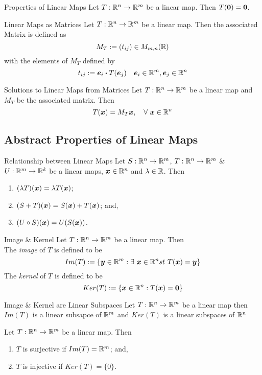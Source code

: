 \documentclass[11pt,a4paper]{article}
\begin{document}
\subtitle{Theorem 5.02 - }{Properties of Linear Maps}
Let $T : \mathbb{R}^n \to \mathbb{R}^m$ be a linear map. Then $T(\boldsymbol{0}) = \boldsymbol{0}$. \\

\subtitle{Definiton 5.03 - }{Linear Maps as Matrices}
Let $T : \mathbb{R}^n \to \mathbb{R}^m$ be a linear map. Then the associated Matrix is defined as
$$M_T := (t_{ij}) \in M_{m,n}(\mathbb{R})$$
with the elements of $M_T$ defined by
$$t_{ij} := \boldsymbol{e}_i \boldsymbol{\cdot} T(\boldsymbol{e}_j)\quad\boldsymbol{e}_i \in \mathbb{R}^m, \boldsymbol{e}_j \in \mathbb{R}^n$$

\subtitle{Theorem 5.04 - }{Solutions to Linear Maps from Matrices}
Let $T : \mathbb{R}^n \to \mathbb{R}^m$ be a linear map and $M_T$ be the associated matrix. Then $$T(\boldsymbol{x}) = M_T\boldsymbol{x},\quad \forall\ \boldsymbol{x} \in \mathbb{R}^n$$

\subsection{Abstract Properties of Linear Maps}
%
\subtitle{Theorem 5.05 - }{Relationship between Linear Maps}
Let $S : \mathbb{R}^n \to \mathbb{R}^m$, $T : \mathbb{R}^n \to \mathbb{R}^m$ \& $U : \mathbb{R}^m \to \mathbb{R}^k$ be a linear maps, $\boldsymbol{x} \in \mathbb{R}^n$ and $\lambda \in \mathbb{R}$. Then
\begin{enumerate}[label=\roman*)]
  \item $(\lambda T)(\boldsymbol{x}) = \lambda T(\boldsymbol{x})$;
  \item $(S + T)(\boldsymbol{x}) = S(\boldsymbol{x}) + T(\boldsymbol{x})$; and,
  \item $(U \circ S)(\boldsymbol{x}) = U(S(\boldsymbol{x}))$.\\
\end{enumerate}

\subtitle{Definition 5.06 - }{Image \& Kernel}
Let $T : \mathbb{R}^n \to \mathbb{R}^m$ be a linear map. Then\\
The \textit{image} of $T$ is defined to be $$Im(T) := \{\boldsymbol{y} \in \mathbb{R}^m : \exists\ \boldsymbol{x} \in \mathbb{R}^n st\ T(\boldsymbol{x}) = \boldsymbol{y}\}$$
The \textit{kernel} of $T$ is defined to be $$Ker(T) := \{\boldsymbol{x} \in \mathbb{R}^n : T(\boldsymbol{x}) = \boldsymbol{0}\}$$

\subtitle{Theorem 5.07 - }{Image \& Kernel are Linear Subspaces}
Let $T : \mathbb{R}^n \to \mathbb{R}^m$ be a linear map then $Im(T)$ is a linear subsapce of $\mathbb{R}^m$ and $Ker(T)$ is a linear subspaces of $\mathbb{R}^n$ \\

\subtitle{Remark 5.08}{}
Let $T : \mathbb{R}^n \to \mathbb{R}^m$ be a linear map. Then
\begin{enumerate}[label=\roman*)]
  \item $T$ is surjective if $Im(T) = \mathbb{R}^m$; and,
  \item $T$ is injective if $Ker(T) = \{ 0\}$.
\end{enumerate}
\end{document}
